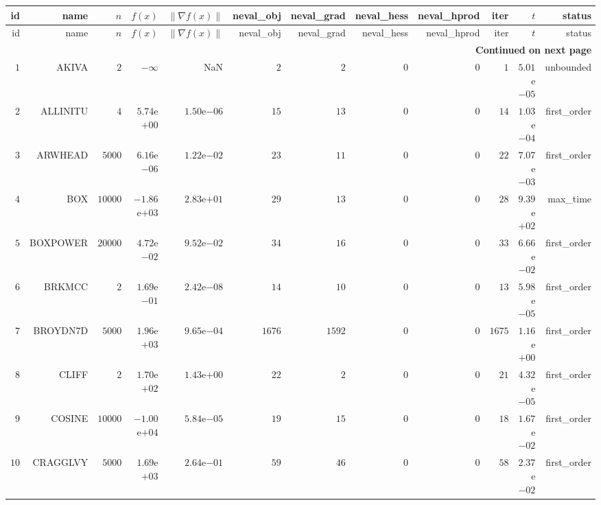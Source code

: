 \begin{longtable}{rrrrrrrrrrrr}
  \hline
  id & name & \(n\) & \(f(x)\) & \(\|\nabla f(x)\|\) & neval\_obj & neval\_grad & neval\_hess & neval\_hprod & iter & \(t\) & status \\\hline
  \endfirsthead
  \hline
  id & name & \(n\) & \(f(x)\) & \(\|\nabla f(x)\|\) & neval\_obj & neval\_grad & neval\_hess & neval\_hprod & iter & \(t\) & status \\\hline
  \endhead
  \hline
  \multicolumn{12}{r}{{\bfseries Continued on next page}}\\
  \hline
  \endfoot
  \endlastfoot
  \(     1\) & AKIVA & \(     2\) & \(-\infty\) &       NaN & \(     2\) & \(     2\) & \(     0\) & \(     0\) & \(     1\) & \( 5.01\)e\(-05\) & unbounded \\
  \(     2\) & ALLINITU & \(     4\) & \( 5.74\)e\(+00\) & \( 1.50\)e\(-06\) & \(    15\) & \(    13\) & \(     0\) & \(     0\) & \(    14\) & \( 1.03\)e\(-04\) & first\_order \\
  \(     3\) & ARWHEAD & \(  5000\) & \( 6.16\)e\(-06\) & \( 1.22\)e\(-02\) & \(    23\) & \(    11\) & \(     0\) & \(     0\) & \(    22\) & \( 7.07\)e\(-03\) & first\_order \\
  \(     4\) & BOX & \( 10000\) & \(-1.86\)e\(+03\) & \( 2.83\)e\(+01\) & \(    29\) & \(    13\) & \(     0\) & \(     0\) & \(    28\) & \( 9.39\)e\(+02\) & max\_time \\
  \(     5\) & BOXPOWER & \( 20000\) & \( 4.72\)e\(-02\) & \( 9.52\)e\(-02\) & \(    34\) & \(    16\) & \(     0\) & \(     0\) & \(    33\) & \( 6.66\)e\(-02\) & first\_order \\
  \(     6\) & BRKMCC & \(     2\) & \( 1.69\)e\(-01\) & \( 2.42\)e\(-08\) & \(    14\) & \(    10\) & \(     0\) & \(     0\) & \(    13\) & \( 5.98\)e\(-05\) & first\_order \\
  \(     7\) & BROYDN7D & \(  5000\) & \( 1.96\)e\(+03\) & \( 9.65\)e\(-04\) & \(  1676\) & \(  1592\) & \(     0\) & \(     0\) & \(  1675\) & \( 1.16\)e\(+00\) & first\_order \\
  \(     8\) & CLIFF & \(     2\) & \( 1.70\)e\(+02\) & \( 1.43\)e\(+00\) & \(    22\) & \(     2\) & \(     0\) & \(     0\) & \(    21\) & \( 4.32\)e\(-05\) & first\_order \\
  \(     9\) & COSINE & \( 10000\) & \(-1.00\)e\(+04\) & \( 5.84\)e\(-05\) & \(    19\) & \(    15\) & \(     0\) & \(     0\) & \(    18\) & \( 1.67\)e\(-02\) & first\_order \\
  \(    10\) & CRAGGLVY & \(  5000\) & \( 1.69\)e\(+03\) & \( 2.64\)e\(-01\) & \(    59\) & \(    46\) & \(     0\) & \(     0\) & \(    58\) & \( 2.37\)e\(-02\) & first\_order \\

\end{longtable}
